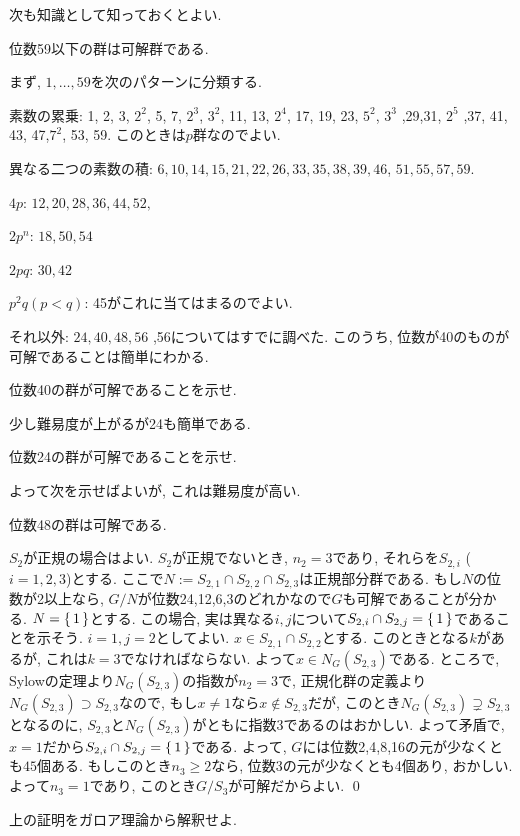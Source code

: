 次も知識として知っておくとよい.
\begin{theo}
位数59以下の群は可解群である.
\end{theo}
\prf まず, $1,\dots,59$を次のパターンに分類する.
\ben
\item 素数の累乗: 1, 2, 3, $2^2$, 5, 7, $2^3$, $3^2$, 11, 13, $2^4$, 17, 19, 23, $5^2$, $3^3$ ,29,31, $2^5$ ,37, 41, 43, 47,$7^2$, 53, 59. このときは$p$群なのでよい.
\item 異なる二つの素数の積: $6,10,14,15,21,22,26,33,35,38,39,46$, $51,55,57,59$.
\item $4p$: $12,20,28,36,44,52,$
\item $2p^n$: $18,50,54$
\item $2pq$: $30,42$
\item $p^2q (p<q)$: 45がこれに当てはまるのでよい.
\item それ以外: $24,40,48,56$
,56についてはすでに調べた.
このうち, 位数が40のものが可解であることは簡単にわかる.
\begin{prac}
位数40の群が可解であることを示せ.
\end{prac}
少し難易度が上がるが24も簡単である.
\begin{prac}
位数24の群が可解であることを示せ.
\end{prac}
よって次を示せばよいが, これは難易度が高い.
\begin{claim}
位数48の群は可解である.
\end{claim}
\prf $S_2$が正規の場合はよい. $S_2$が正規でないとき, $n_2 = 3$であり, それらを$S_{2,i}$ ($i=1,2,3$)とする. ここで$N:=S_{2,1}\cap S_{2,2} \cap S_{2,3}$は正規部分群である. もし$N$の位数が2以上なら, $G/N$が位数24,12,6,3のどれかなので$G$も可解であることが分かる. $N=\set{1}$とする. この場合, 実は異なる$i,j$について$S_{2,i}\cap S_{2,j} = \set{1}$であることを示そう. $i=1,j=2$としてよい. $x\in S_{2,1}\cap S_{2,2}$とする. このときとなる$k$があるが, これは$k=3$でなければならない. よって$x\in N_{G}(S_{2,3})$である. ところで, Sylowの定理より$N_{G}(S_{2,3})$の指数が$n_2 = 3$で, 正規化群の定義より$N_{G}(S_{2,3})\supset S_{2,3}$なので, もし$x\neq 1$なら$x\notin S_{2,3}$だが, このとき$N_{G}(S_{2,3})\supsetneq S_{2,3}$となるのに,  $S_{2,3}$と$N_{G}(S_{2,3})$がともに指数3であるのはおかしい. よって矛盾で, $x=1$だから$S_{2,i}\cap S_{2,j} = \set{1}$である. よって, $G$には位数2,4,8,16の元が少なくとも$45$個ある. もしこのとき$n_3 \geq 2$なら, 位数3の元が少なくとも4個あり, おかしい. よって$n_3 = 1$であり, このとき$G/S_3$が可解だからよい. \qed
\begin{prac}
上の証明をガロア理論から解釈せよ.
\end{prac}



